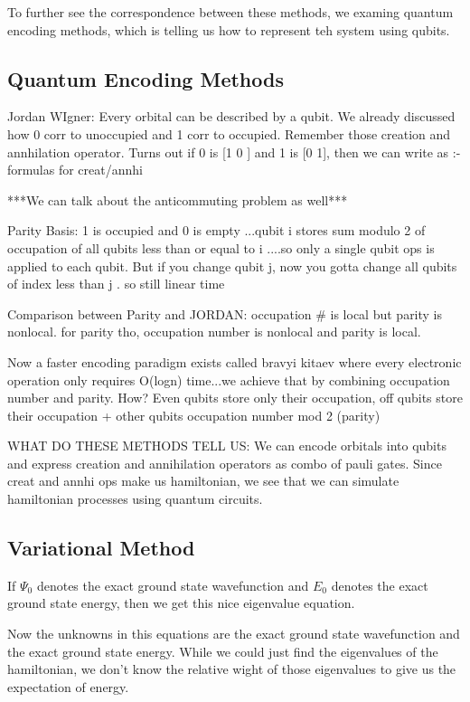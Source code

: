 \documentclass{article}
\begin{document}
To further see the correspondence between these methods, we examing quantum
encoding methods, which is telling us how to represent teh system using qubits.

\subsection{Quantum Encoding Methods}
Jordan WIgner: Every orbital can be described by a qubit. We already discussed
how 0 corr to unoccupied and 1 corr to occupied.
Remember those creation and annhilation operator. Turns out  if 0 is [1 0 ] and
1 is [0  1],
then we can write as :- formulas for creat/annhi

***We can talk about the anticommuting problem as well***

Parity Basis: 1 is occupied and 0 is empty ...qubit i stores sum modulo 2 of
occupation of all qubits less than or equal to i ....so only a single qubit
ops is applied to each qubit. But if you change qubit j, now you gotta change
all qubits of index less than j . so still linear time

Comparison between Parity and JORDAN: occupation # is local but parity is
nonlocal.
for parity tho, occupation number is nonlocal and parity is local.

Now a faster encoding paradigm exists called bravyi kitaev where every electronic
operation only requires O(logn) time...we achieve that by combining occupation
number and parity. How? Even qubits store only their occupation, off qubits
store their occupation + other qubits occupation number mod 2 (parity)

WHAT DO THESE METHODS TELL US:
We can encode orbitals into qubits and express creation and annihilation
operators as combo of pauli gates. Since creat and annhi ops make us hamiltonian,
we see that we can simulate hamiltonian processes using quantum circuits.
\subsection{Variational Method}

If \(\Psi_0\) denotes the exact ground state wavefunction and \(E_0\) denotes
the exact ground state energy, then we get this nice eigenvalue equation.

Now the unknowns in this equations are the exact ground state wavefunction
and the exact ground state energy.
While we could just find the eigenvalues of the hamiltonian, we don't know
the relative wight of those eigenvalues to give us the expectation of energy.
\end{document}
